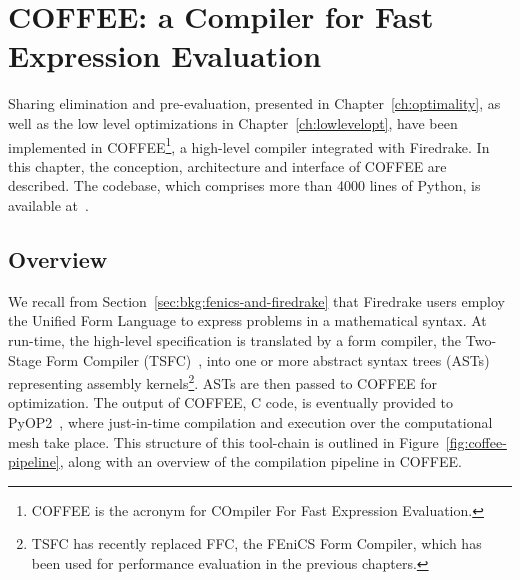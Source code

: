 \chapter{COFFEE: a Compiler for Fast Expression Evaluation}
\label{ch:coffee}

Sharing elimination and pre-evaluation, presented in Chapter~\ref{ch:optimality}, as well as the low level optimizations in Chapter~\ref{ch:lowlevelopt}, have been implemented in COFFEE\footnote{COFFEE is the acronym for COmpiler For Fast Expression Evaluation.}, a high-level compiler integrated with Firedrake. In this chapter, the conception, architecture and interface of COFFEE are described. The codebase, which comprises more than 4000 lines of Python, is available at~\citep{coffee-code}.


\section{Overview}

We recall from Section~\ref{sec:bkg:fenics-and-firedrake} that Firedrake users employ the Unified Form Language to express problems in a mathematical syntax. At run-time, the high-level specification is translated by a form compiler, the Two-Stage Form Compiler (TSFC)~\citep{TSFC}, into one or more abstract syntax trees (ASTs) representing assembly kernels\footnote{TSFC has recently replaced FFC, the FEniCS Form Compiler, which has been used for performance evaluation in the previous chapters.}. ASTs are then passed to COFFEE for optimization. The output of COFFEE, C code, is eventually provided to PyOP2~\citep{pyop2isc}, where just-in-time compilation and execution over the computational mesh take place. This structure of this tool-chain is outlined in Figure~\ref{fig:coffee-pipeline}, along with an overview of the compilation pipeline in COFFEE. 

